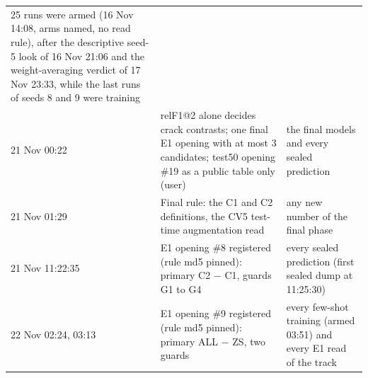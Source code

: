 \begin{table}[htbp]
\begin{tabular}{@{}p{2.3cm}p{6.1cm}p{5.6cm}@{}}
25 runs were armed (16 Nov 14:08, arms named, no read rule), after the descriptive seed-5 look of 16 Nov 21:06 and the
weight-averaging verdict of 17 Nov 23:33, while the last runs of seeds 8 and 9 were training \\
21 Nov 00:22 & relF1@2 alone decides crack contrasts; one final E1 opening with at most 3 candidates; test50 opening \#19 as a
public table only (user) & the final models and every sealed prediction \\
21 Nov 01:29 & Final rule: the C1 and C2 definitions, the CV5 test-time augmentation read & any new number of the final phase \\
21 Nov 11:22:35 & E1 opening \#8 registered (rule md5 pinned): primary C2 $-$ C1, guards G1 to G4 & every sealed prediction
(first sealed dump at 11:25:30) \\
22 Nov 02:24, 03:13 & E1 opening \#9 registered (rule md5 pinned): primary ALL $-$ ZS, two guards & every few-shot training
(armed 03:51) and every E1 read of the track \\
\bottomrule
\end{tabular}
\end{table}

